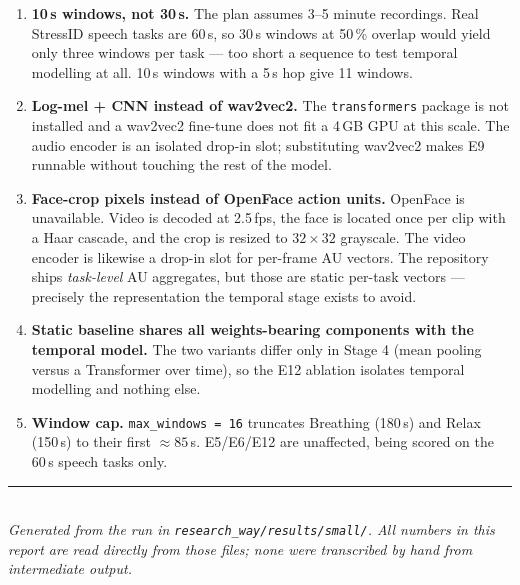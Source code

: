 \documentclass[11pt,a4paper]{article}
\newcommand{\code}[1]{\texttt{\small #1}}
\begin{document}
\begin{enumerate}\itemsep3pt
\item \textbf{10\,s windows, not 30\,s.} The plan assumes 3--5 minute recordings. Real
      StressID speech tasks are 60\,s, so 30\,s windows at 50\,\% overlap would yield only
      three windows per task --- too short a sequence to test temporal modelling at all.
      10\,s windows with a 5\,s hop give 11 windows.

\item \textbf{Log-mel + CNN instead of wav2vec2.} The \code{transformers} package is not
      installed and a wav2vec2 fine-tune does not fit a 4\,GB GPU at this scale. The audio
      encoder is an isolated drop-in slot; substituting wav2vec2 makes E9 runnable without
      touching the rest of the model.

\item \textbf{Face-crop pixels instead of OpenFace action units.} OpenFace is unavailable.
      Video is decoded at 2.5\,fps, the face is located once per clip with a Haar cascade,
      and the crop is resized to $32\times32$ grayscale. The video encoder is likewise a
      drop-in slot for per-frame AU vectors. The repository ships \emph{task-level} AU
      aggregates, but those are static per-task vectors --- precisely the representation
      the temporal stage exists to avoid.

\item \textbf{Static baseline shares all weights-bearing components with the temporal
      model.} The two variants differ only in Stage 4 (mean pooling versus a Transformer
      over time), so the E12 ablation isolates temporal modelling and nothing else.

\item \textbf{Window cap.} \code{max\_windows = 16} truncates Breathing (180\,s) and Relax
      (150\,s) to their first $\approx 85$\,s. E5/E6/E12 are unaffected, being scored on
      the 60\,s speech tasks only.
\end{enumerate}

\vspace{1em}
\noindent\rule{\textwidth}{0.4pt}\\[2pt]
\small\textit{Generated from the run in \code{research\_way/results/small/}. All numbers
in this report are read directly from those files; none were transcribed by hand from
intermediate output.}
\end{document}
